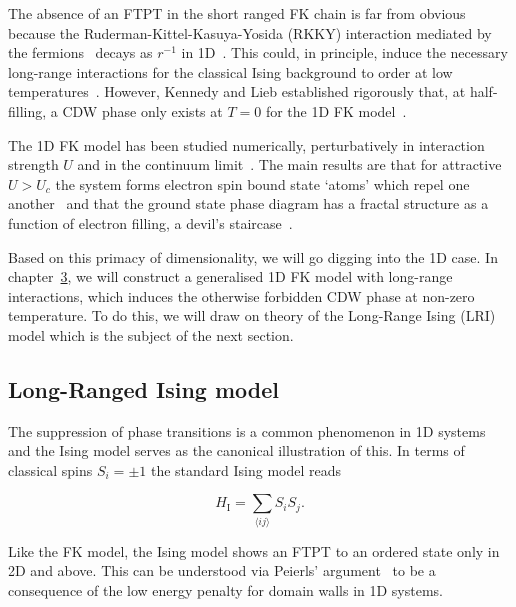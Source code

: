 The absence of an FTPT in the short ranged FK chain is far from obvious because the Ruderman-Kittel-Kasuya-Yosida (RKKY) interaction mediated by the fermions~\autocite{kasuyaTheoryMetallicFerro1956,rudermanIndirectExchangeCoupling1954,vanvleckNoteInteractionsSpins1962,yosidaMagneticPropertiesCuMn1957} decays as \(r^{-1}\) in 1D~\autocite{rusinCalculationRKKYRange2017}. This could, in principle, induce the necessary long-range interactions for the classical Ising background to order at low temperatures~\autocite{thoulessLongRangeOrderOneDimensional1969,peierlsIsingModelFerromagnetism1936}. However, Kennedy and Lieb established rigorously that, at half-filling, a CDW phase only exists at \(T = 0\) for the 1D FK model~\autocite{kennedyItinerantElectronModel1986}.

The 1D FK model has been studied numerically, perturbatively in interaction strength \(U\) and in the continuum limit~\autocite{bursillOneDimensionalContinuum1994}. The main results are that for attractive \(U > U_c\) the system forms electron spin bound state `atoms' which repel one another~\autocite{gruberGroundStateEnergyLowTemperature1993} and that the ground state phase diagram has a fractal structure as a function of electron filling, a devil's staircase~\autocite{freericksTwostateOnedimensionalSpinless1990,michelettiCompleteDevilStaircase1997}.

Based on this primacy of dimensionality, we will go digging into the 1D case. In chapter~\protect\hyperlink{chap:3-the-long-range-falicov-kimball-model}{3}, we will construct a generalised 1D FK model with long-range interactions, which induces the otherwise forbidden CDW phase at non-zero temperature. To do this, we will draw on theory of the Long-Range Ising (LRI) model which is the subject of the next section.

\hypertarget{long-ranged-ising-model}{%
\subsection{Long-Ranged Ising model}\label{long-ranged-ising-model}}

The suppression of phase transitions is a common phenomenon in 1D systems and the Ising model serves as the canonical illustration of this. In terms of classical spins \(S_i = \pm 1\) the standard Ising model reads

\[H_{\mathrm{I}} = \sum_{\langle ij \rangle} S_i S_j.\]

Like the FK model, the Ising model shows an FTPT to an ordered state only in 2D and above. This can be understood via Peierls' argument~\autocite{peierlsIsingModelFerromagnetism1936,kennedyItinerantElectronModel1986} to be a consequence of the low energy penalty for domain walls in 1D systems.

